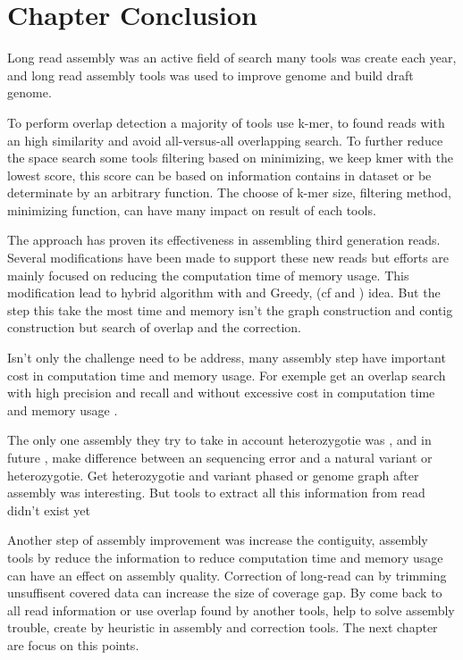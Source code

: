 \documentclass[main]{subfiles}
\begin{document}
\section{Chapter Conclusion}

Long read assembly was an active field of search many tools was create each year, and long read assembly tools was used to improve genome and build draft genome.

To perform overlap detection a majority of tools use k-mer, to found reads with an high similarity and avoid all-versus-all overlapping search. To further reduce the space search some tools filtering based on minimizing, we keep kmer with the lowest score, this score can be based on information contains in dataset or be determinate by an arbitrary function. The choose of k-mer size, filtering method, minimizing function, can have many impact on result of each tools. 

The \OLC approach has proven its effectiveness in assembling third generation reads. Several modifications have been made to support these new reads but efforts are mainly focused on reducing the computation time of memory usage. This modification lead to hybrid \OLC algorithm with \DBG and Greedy, (cf \flye and \wtdbg) idea. But the step this take the most time and memory isn't the graph construction and contig construction but search of overlap and the correction.

Isn't only the challenge need to be address, many assembly step have important cost in computation time and memory usage. For exemple get an overlap search with high precision and recall and without excessive cost in computation time and memory usage \cite{bench_ovl}.

The only one assembly they try to take in account heterozygotie was , and in future \shasta, make difference between an sequencing error and a natural variant or heterozygotie. Get heterozygotie and variant phased or genome graph after assembly was interesting. But tools to extract all this information from read didn't exist yet

Another step of assembly improvement was increase the contiguity, assembly tools by reduce the information to reduce computation time and memory usage can have an effect on assembly quality. Correction of long-read can by trimming unsuffisent covered data can increase the size of coverage gap.
By come back to all read information or use overlap found by another tools, help to solve assembly trouble, create by heuristic in assembly and correction tools. The next chapter are focus on this points.


\end{document}
